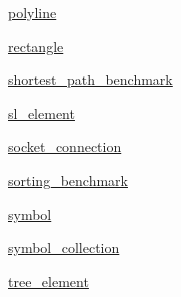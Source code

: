\begin{DoxyCompactItemize}
\item 
 \mbox{\hyperlink{namespacebridges_1_1polyline}{polyline}}
\item 
 \mbox{\hyperlink{namespacebridges_1_1rectangle}{rectangle}}
\item 
 \mbox{\hyperlink{namespacebridges_1_1shortest__path__benchmark}{shortest\+\_\+path\+\_\+benchmark}}
\item 
 \mbox{\hyperlink{namespacebridges_1_1sl__element}{sl\+\_\+element}}
\item 
 \mbox{\hyperlink{namespacebridges_1_1socket__connection}{socket\+\_\+connection}}
\item 
 \mbox{\hyperlink{namespacebridges_1_1sorting__benchmark}{sorting\+\_\+benchmark}}
\item 
 \mbox{\hyperlink{namespacebridges_1_1symbol}{symbol}}
\item 
 \mbox{\hyperlink{namespacebridges_1_1symbol__collection}{symbol\+\_\+collection}}
\item 
 \mbox{\hyperlink{namespacebridges_1_1tree__element}{tree\+\_\+element}}
\end{DoxyCompactItemize}

